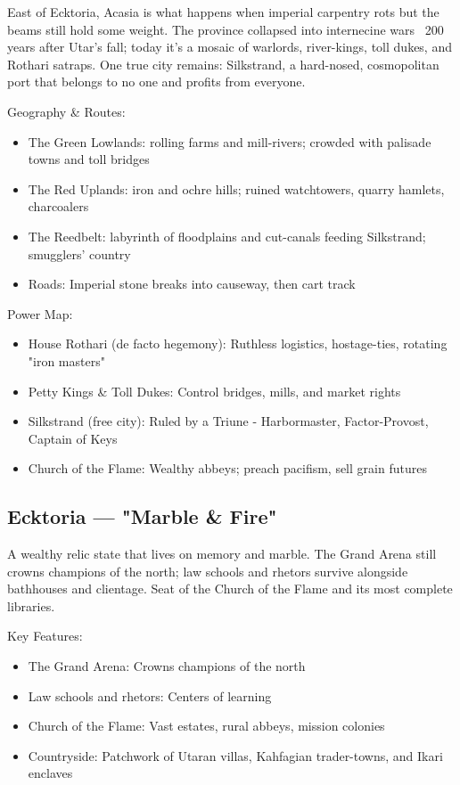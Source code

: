 East of Ecktoria, Acasia is what happens when imperial carpentry rots but the beams still hold some weight. The province collapsed into internecine wars ~200 years after Utar's fall; today it's a mosaic of warlords, river-kings, toll dukes, and Rothari satraps. One true city remains: Silkstrand, a hard-nosed, cosmopolitan port that belongs to no one and profits from everyone.

Geography \& Routes:
\begin{itemize}
    \item The Green Lowlands: rolling farms and mill-rivers; crowded with palisade towns and toll bridges
    \item The Red Uplands: iron and ochre hills; ruined watchtowers, quarry hamlets, charcoalers
    \item The Reedbelt: labyrinth of floodplains and cut-canals feeding Silkstrand; smugglers' country
    \item Roads: Imperial stone breaks into causeway, then cart track
\end{itemize}

Power Map:
\begin{itemize}
    \item House Rothari (de facto hegemony): Ruthless logistics, hostage-ties, rotating "iron masters"
    \item Petty Kings \& Toll Dukes: Control bridges, mills, and market rights
    \item Silkstrand (free city): Ruled by a Triune - Harbormaster, Factor-Provost, Captain of Keys
    \item Church of the Flame: Wealthy abbeys; preach pacifism, sell grain futures
\end{itemize}

\subsection{Ecktoria — "Marble \& Fire"}
\label{sec:ectkoria}

A wealthy relic state that lives on memory and marble. The Grand Arena still crowns champions of the north; law schools and rhetors survive alongside bathhouses and clientage. Seat of the Church of the Flame and its most complete libraries.

Key Features:
\begin{itemize}
    \item The Grand Arena: Crowns champions of the north
    \item Law schools and rhetors: Centers of learning
    \item Church of the Flame: Vast estates, rural abbeys, mission colonies
    \item Countryside: Patchwork of Utaran villas, Kahfagian trader-towns, and Ikari enclaves
\end{itemize}

